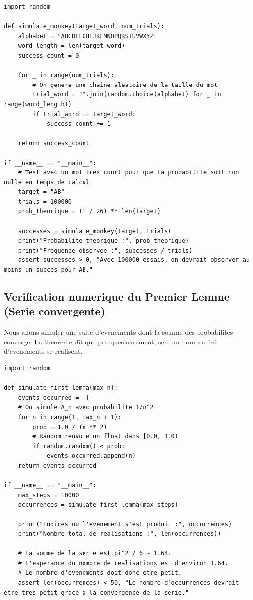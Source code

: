 \documentclass[11pt,a4paper]{article}
\begin{document}
\begin{lstlisting}
import random

def simulate_monkey(target_word, num_trials):
    alphabet = "ABCDEFGHIJKLMNOPQRSTUVWXYZ"
    word_length = len(target_word)
    success_count = 0

    for _ in range(num_trials):
        # On genere une chaine aleatoire de la taille du mot
        trial_word = "".join(random.choice(alphabet) for _ in range(word_length))
        if trial_word == target_word:
            success_count += 1

    return success_count

if __name__ == "__main__":
    # Test avec un mot tres court pour que la probabilite soit non nulle en temps de calcul
    target = "AB"
    trials = 100000
    prob_theorique = (1 / 26) ** len(target)

    successes = simulate_monkey(target, trials)
    print("Probabilite theorique :", prob_theorique)
    print("Frequence observee :", successes / trials)
    assert successes > 0, "Avec 100000 essais, on devrait observer au moins un succes pour AB."
\end{lstlisting}


\subsection*{Verification numerique du Premier Lemme (Serie convergente)}
Nous allons simuler une suite d'evenements dont la somme des probabilites converge.
Le theoreme dit que presques surement, seul un nombre fini d'evenements se realisent.

\begin{lstlisting}
import random

def simulate_first_lemma(max_n):
    events_occurred = []
    # On simule A_n avec probabilite 1/n^2
    for n in range(1, max_n + 1):
        prob = 1.0 / (n ** 2)
        # Random renvoie un float dans [0.0, 1.0)
        if random.random() < prob:
            events_occurred.append(n)
    return events_occurred

if __name__ == "__main__":
    max_steps = 10000
    occurrences = simulate_first_lemma(max_steps)

    print("Indices ou l'evenement s'est produit :", occurrences)
    print("Nombre total de realisations :", len(occurrences))

    # La somme de la serie est pi^2 / 6 ~ 1.64.
    # L'esperance du nombre de realisations est d'environ 1.64.
    # Le nombre d'evenements doit donc etre petit.
    assert len(occurrences) < 50, "Le nombre d'occurrences devrait etre tres petit grace a la convergence de la serie."
\end{lstlisting}
\end{document}

